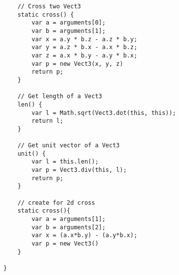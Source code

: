 \begin{lstlisting}
	// Cross two Vect3
	static cross() {
		var a = arguments[0];
		var b = arguments[1];
		var	x = a.y * b.z - a.z * b.y;
		var	y = a.z * b.x - a.x * b.z;
		var	z = a.x * b.y - a.y * b.x;
		var p = new Vect3(x, y, z)
		return p;
	}
	
	// Get length of a Vect3
	len() {
		var l = Math.sqrt(Vect3.dot(this, this));
		return l;
	}
	
	// Get unit vector of a Vect3
	unit() {
		var l = this.len();
		var p = Vect3.div(this, l);
		return p;
	}

	// create for 2d cross
	static cross(){
		var a = arguments[1];
		var b = arguments[2];
		var x = (a.x*b.y) - (a.y*b.x);
		var p = new Vect3() 
	}

}

\end{lstlisting}


